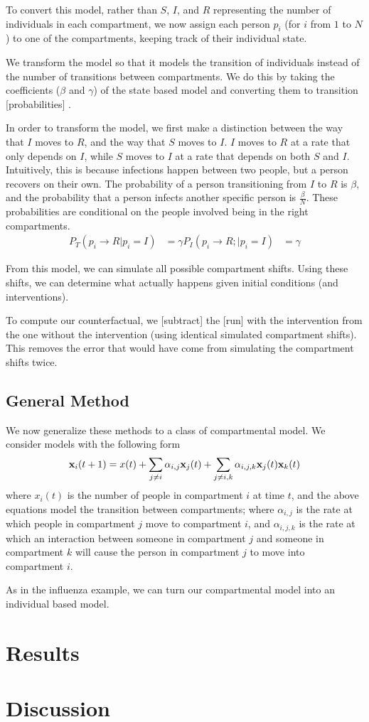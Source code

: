 \documentclass{article}
\renewcommand{\vec}[1]{{\textbf #1}}
\begin{document}
To convert this model, rather than $S$, $I$, and $R$ representing the number of individuals in each compartment, we now assign each person $p_i$ (for $i$ from $1$ to $N$) to one of the compartments, keeping track of their individual state.

We transform the model so that it models the transition of individuals instead of the number of transitions between compartments.  We do this by taking the coefficients ($\beta$ and $\gamma$) of the state based model and converting them to transition [probabilities] %
.

In order to transform the model, we first make a distinction between the way that $I$ moves to $R$, and the way that $S$ moves to $I$.  $I$ moves to $R$ at a rate that only depends on $I$, while $S$ moves to $I$ at a rate that depends on both $S$ and $I$.  Intuitively, this is because infections happen between two people, but a person recovers on their own.  The probability of a person transitioning from $I$ to $R$ is $\beta$, and the probability that a person infects another specific person is $\frac{\beta}{N}$.  These probabilities are conditional on the people involved being in the right compartments.
\begin{align*}
P_T(p_i \rightarrow R \vert p_i = I) &= \gamma
P_I(p_i \rightarrow R;  \vert p_i = I) &= \gamma
\end{align*}

From this model, we can simulate all possible compartment shifts. %
Using these shifts, we can determine what actually happens given initial conditions (and interventions).

To compute our counterfactual, we [subtract] the [run] with the intervention from the one without the intervention (using identical simulated compartment shifts).  This removes the error that would have come from simulating the compartment shifts twice.

\subsection*{General Method}

We now generalize these methods to a class of compartmental model.  We consider models with the following form
\begin{align*}
\vec{x}_i(t+1) = x(t) + \sum_{j \neq i} \alpha_{i,j} \vec{x}_j(t) +  \sum_{j \neq i,k} \alpha_{i,j,k} \vec{x}_j(t) \vec x_k(t)
\end{align*}
where $x_i(t)$ is the number of people in compartment $i$ at time $t$, and the above equations model the transition between compartments; where $\alpha_{i,j}$ is the rate at which people in compartment $j$ move to compartment $i$, and $\alpha_{i,j,k}$ is the rate at which an interaction between someone in compartment $j$ and someone in compartment $k$ will cause the person in compartment $j$ to move into compartment $i$.

As in the influenza example, we can turn our compartmental model into an individual based model.

\section{Results}
\section{Discussion}

{}

\end{document}
